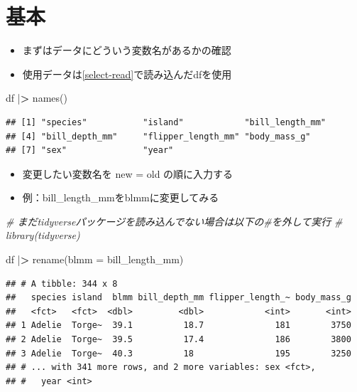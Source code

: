 \documentclass[
  xelatex,ja=standard, b5paper]{bxjsbook}
\newenvironment{Shaded}{\begin{snugshade}}{\end{snugshade}}
\newcommand{\AttributeTok}[1]{\textcolor[rgb]{0.77,0.63,0.00}{#1}}
\newcommand{\CommentTok}[1]{\textcolor[rgb]{0.56,0.35,0.01}{\textit{#1}}}
\newcommand{\ErrorTok}[1]{\textcolor[rgb]{0.64,0.00,0.00}{\textbf{#1}}}
\newcommand{\FunctionTok}[1]{\textcolor[rgb]{0.00,0.00,0.00}{#1}}
\newcommand{\NormalTok}[1]{#1}
\newcommand{\SpecialCharTok}[1]{\textcolor[rgb]{0.00,0.00,0.00}{#1}}
\providecommand{\tightlist}{%
  \setlength{\itemsep}{0pt}\setlength{\parskip}{0pt}}
\begin{document}
\hypertarget{rename-standard}{%
\section{基本}\label{rename-standard}}

\begin{itemize}
\tightlist
\item
  まずはデータにどういう変数名があるかの確認
\item
  使用データは\ref{select-read}で読み込んだdfを使用
\end{itemize}

\begin{Shaded}
\begin{Highlighting}[]
\NormalTok{df }\SpecialCharTok{|}\ErrorTok{\textgreater{}} \FunctionTok{names}\NormalTok{()}
\end{Highlighting}
\end{Shaded}

\begin{verbatim}
## [1] "species"           "island"            "bill_length_mm"   
## [4] "bill_depth_mm"     "flipper_length_mm" "body_mass_g"      
## [7] "sex"               "year"
\end{verbatim}

\begin{itemize}
\tightlist
\item
  変更したい変数名を new = old の順に入力する
\item
  例：bill\_length\_mmをblmmに変更してみる
\end{itemize}

\begin{Shaded}
\begin{Highlighting}[]
\CommentTok{\# まだtidyverseパッケージを読み込んでない場合は以下の\#を外して実行}
\CommentTok{\# library(tidyverse)}

\NormalTok{df }\SpecialCharTok{|}\ErrorTok{\textgreater{}} 
  \FunctionTok{rename}\NormalTok{(}\AttributeTok{blmm =}\NormalTok{ bill\_length\_mm)}
\end{Highlighting}
\end{Shaded}

\begin{verbatim}
## # A tibble: 344 x 8
##   species island  blmm bill_depth_mm flipper_length_~ body_mass_g
##   <fct>   <fct>  <dbl>         <dbl>            <int>       <int>
## 1 Adelie  Torge~  39.1          18.7              181        3750
## 2 Adelie  Torge~  39.5          17.4              186        3800
## 3 Adelie  Torge~  40.3          18                195        3250
## # ... with 341 more rows, and 2 more variables: sex <fct>,
## #   year <int>
\end{verbatim}
\end{document}
